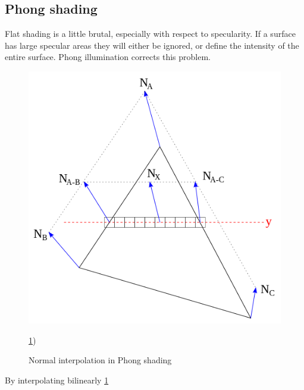 \subsection{Phong shading}
Flat shading is a little brutal, especially with respect to specularity. If a
surface has large specular areas they will either be ignored, or define the
intensity of the entire surface. Phong illumination corrects this problem.

\begin{figure}[H]
	\centering
	\scalebox{0.5}
	{\includegraphics{pics/phongInterpol.png}}
	\caption{Normal interpolation in Phong shading}
	\label{fig:phongInterpo}
\ref{fig:phongInterpo})
\end{figure}
By interpolating bilinearly \ref{fig:phongInterpo}
